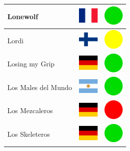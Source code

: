 \documentclass[12pt, a4paper, twoside]{report}
\begin{document}
\begin{center}
\begin{longtable}{|p{5cm}|p{2cm}|p{2cm}|}
 Lonewolf                                                   & \includegraphics[width=1cm]{../4x3/fr} &   \includegraphics[width=1cm]{../likes/y} \\ \hline
 Lordi                                                      & \includegraphics[width=1cm]{../4x3/fi} &   \includegraphics[width=1cm]{../likes/m} \\ \hline
 Losing my Grip                                             & \includegraphics[width=1cm]{../4x3/de} &   \includegraphics[width=1cm]{../likes/y} \\ \hline
 Los Males del Mundo                                        & \includegraphics[width=1cm]{../4x3/ar} &   \includegraphics[width=1cm]{../likes/y} \\ \hline
 Los Mezcaleros                                             & \includegraphics[width=1cm]{../4x3/de} &   \includegraphics[width=1cm]{../likes/n} \\ \hline
 Los Skeleteros                                             & \includegraphics[width=1cm]{../4x3/de} &   \includegraphics[width=1cm]{../likes/y} \\ \hline

\end{longtable}
\end{center}
\end{document}
